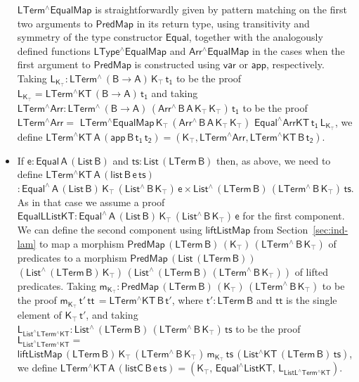 \documentclass[9pt]{entcs}
\begin{document}
\begin{itemize}
  $\mathsf{LTerm^\wedge EqualMap}$ is straightforwardly given by
  pattern matching on the first two arguments to $\mathsf{PredMap}$ in
  its return type, using transitivity and symmetry of the type
  constructor $\mathsf{Equal}$, together with the analogously defined
  functions $\mathsf{LType^\wedge EqualMap}$ and $\mathsf{Arr^\wedge
    EqualMap}$ in the cases when the first argument to
  $\mathsf{PredMap}$ is constructed using $\mathsf{var}$ or
  $\mathsf{app}$, respectively. Taking $\mathsf{L_{K_\top} :
    LTerm^{\wedge}\, (B \to A) \, K_\top\, t_1}$ to be the proof
  $\mathsf{L_{K_\top} = LTerm^\wedge KT\, (B \to A)\, t_1}$ and taking
  $\mathsf{ LTerm^\wedge Arr : LTerm^{\wedge}\, (B \to A)\,
    (Arr^{\wedge} \, B\, A\, K_\top \, K_\top)\, t_1}$ to be the proof
  $\mathsf{LTerm^\wedge Arr =}$ $\mathsf{LTerm^\wedge
    EqualMap\,K_\top\,(Arr^{\wedge}\,B\,A\,K_\top\,K_\top)\,\,
    Equal^\wedge ArrKT\, t_1\, L_{K_\top}}$, we define
  $\mathsf{LTerm^\wedge KT\,A\, (app\, B\, t_1\, t_2) = (K_\top ,
    LTerm^\wedge Arr , LTerm^\wedge KT\,B\,t_2)}$.
\item If $\mathsf{e : Equal\,A\,(List\,B)}$ and $\mathsf{ts :
  List\,(LTerm\, B)}$ then, as above, we need to define
  $\mathsf{LTerm^\wedge KT\,A\, (list\, B \,e\, ts)}$ $\mathsf{:
  Equal^{\wedge} \, A\, (List\,B)\, K_\top\, (List^{\wedge} \, B\,
  K_\top) \, e \times List^{\wedge}\, (LTerm\,B) \, (LTerm^{\wedge} \,
  B\, K_\top) \, ts }$.  As in that case we assume a proof
  $\mathsf{EqualLListKT : Equal^{\wedge} \, A\, (List\,B)\, K_\top\,
  (List^{\wedge} \, B\, K_\top) \, e}$ for the first component.  We
  can define the second component using $\mathsf{liftListMap}$ from
  Section~\ref{sec:ind-lam} to map a morphism $\mathsf{PredMap\,
    (LTerm\,B)\, (K_\top)\, (LTerm^{\wedge}\,B\,K_\top)}$ of
  predicates to a morphism $\mathsf{PredMap\,(List\,(LTerm\,B))}$
  $\mathsf{(List^{\wedge}\,(LTerm\,B)\,K_\top) \,
    (List^{\wedge}\,(LTerm\,B)\, (LTerm^{\wedge}\,B\,K_\top))}$ of
  lifted predicates.  Taking $\mathsf{m_{K_\top} : PredMap\,
    (LTerm\,B) \, (K_\top)\, (LTerm^{\wedge}\,B\,K_\top)}$ to be the
  proof $\mathsf{m_{K_\top} \, t'\, tt\, = LTerm^\wedge KT\, B\, t'}$,
  where $\mathsf{t' : LTerm\,B}$ and $\mathsf{tt}$ is the single
  element of $\mathsf{K_\top\, t'}$, and taking
  $\mathsf{L_{List^\wedge LTerm^\wedge KT} : List^{\wedge}\,
    (LTerm\,B) \, (LTerm^{\wedge} \, B\, K_\top) \, ts}$ to be the
  proof $\mathsf{ L_{List^\wedge LTerm^\wedge KT} =}$
  $\mathsf{liftListMap \, (LTerm\,B) \, K_\top \, (LTerm^{\wedge}\,
    B\, K_\top) \, m_{K_\top} \, ts \, (List^\wedge KT\, (LTerm\, B)\,
    ts) }$, we define $\mathsf{LTerm^\wedge KT\,A\, (listC\, B\, e\,
    ts) = (K_\top , \, Equal^\wedge ListKT , \, L_{ListL^\wedge
      Term^\wedge KT} ) }$.
\end{itemize}
\end{document}
